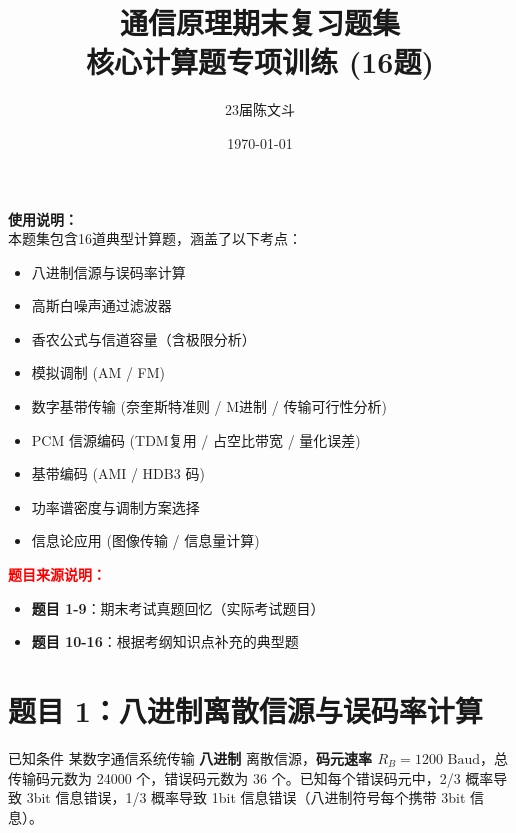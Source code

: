\documentclass[12pt, a4paper]{article}
\title{\textbf{通信原理期末复习题集}\\ \large 核心计算题专项训练 (16题)}
\author{23届陈文斗}
\date{\today}
\begin{document}
	
	\maketitle
	\thispagestyle{empty}
	\begin{center}
		\vspace{1cm}
		\textbf{使用说明：}\\
		本题集包含16道典型计算题，涵盖了以下考点：\\
		\vspace{0.5cm}
		\begin{itemize}
			\item 八进制信源与误码率计算
			\item 高斯白噪声通过滤波器
			\item 香农公式与信道容量（含极限分析）
			\item 模拟调制 (AM / FM)
			\item 数字基带传输 (奈奎斯特准则 / M进制 / 传输可行性分析)
			\item PCM 信源编码 (TDM复用 / 占空比带宽 / 量化误差)
			\item 基带编码 (AMI / HDB3 码)
			\item 功率谱密度与调制方案选择
			\item 信息论应用 (图像传输 / 信息量计算)
		\end{itemize}
		\vspace{0.8cm}
		\textcolor{red}{\textbf{题目来源说明：}}\\
		\vspace{0.3cm}
		\begin{itemize}
			\item \textbf{题目 1-9}：期末考试真题回忆（实际考试题目）
			\item \textbf{题目 10-16}：根据考纲知识点补充的典型题
		\end{itemize}
	\end{center}
	\newpage
	
	\section*{题目 1：八进制离散信源与误码率计算}
	
	\begin{problembox}{已知条件}
		某数字通信系统传输 \textbf{八进制} 离散信源，\textbf{码元速率 $R_B=1200 \text{ Baud}$}，总传输码元数为 24000 个，错误码元数为 36 个。已知每个错误码元中，2/3 概率导致 3bit 信息错误，1/3 概率导致 1bit 信息错误（八进制符号每个携带 3bit 信息）。
	\end{problembox}
	
\end{document}
